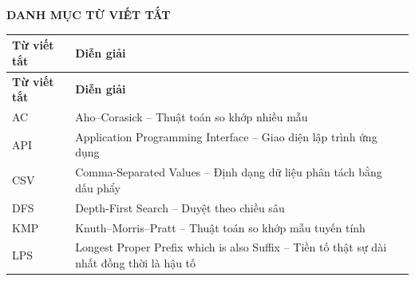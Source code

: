 \newpage
\thispagestyle{plain}

\begin{center}
    {\bfseries\Large DANH MỤC TỪ VIẾT TẮT}
\end{center}

\vspace{0.8cm}

\renewcommand{\arraystretch}{1.25}

\begin{longtable}{>{\centering\arraybackslash}p{3.2cm} p{10.5cm}}
    \toprule
    \textbf{Từ viết tắt} & \textbf{Diễn giải} \\
    \midrule
    \endfirsthead

    \toprule
    \textbf{Từ viết tắt} & \textbf{Diễn giải} \\
    \midrule
    \endhead

    AC & Aho--Corasick -- Thuật toán so khớp nhiều mẫu \\

    API & Application Programming Interface -- Giao diện lập trình ứng dụng \\

    CSV & Comma-Separated Values -- Định dạng dữ liệu phân tách bằng dấu phẩy \\

    DFS & Depth-First Search -- Duyệt theo chiều sâu \\

    KMP & Knuth--Morris--Pratt -- Thuật toán so khớp mẫu tuyến tính \\

    LPS & Longest Proper Prefix which is also Suffix -- Tiền tố thật sự dài nhất đồng thời là hậu tố \\

    \bottomrule
\end{longtable}
